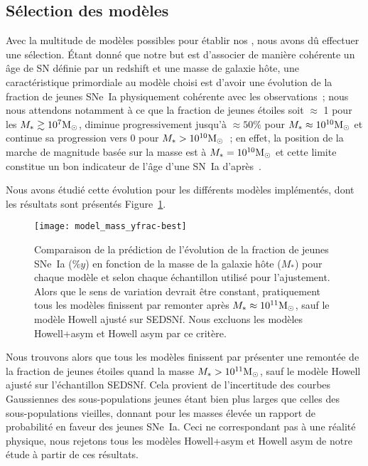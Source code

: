 \documentclass[../main/main.tex]{subfiles}
\begin{document}
\subsection{Sélection des modèles}\label{ssec:mmodsel}

Avec la multitude de modèles possibles pour établir nos \hostlib, nous avons dû
effectuer une sélection. Étant donné que notre but est d'associer de manière
cohérente un âge de SN définie par un redshift et une masse de galaxie hôte, une
caractéristique primordiale au modèle choisi est d'avoir une évolution de la
fraction de jeunes SNe~Ia physiquement cohérente avec les observations~; nous
nous attendons notamment à ce que la fraction de jeunes étoiles soit $\approx$ 1
pour les $M_* \gtrsim 10^7\si{\Msun}$, diminue progressivement jusqu'à $\approx
50\%$ pour $M_* \approx 10^{10}\si{\Msun}$ et continue sa progression vers 0
pour $M_* > 10^{10}\si{\Msun}$~; en effet, la position de la marche de magnitude
basée sur la masse est à $M_* = 10^{10}\si{\Msun}$ et cette limite constitue un
bon indicateur de l'âge d'une SN~Ia d'après~\cite{briday2022}.

Nous avons étudié cette évolution pour les différents modèles implémentés, dont
les résultats sont présentés Figure~\ref{fig:ypc}.

\begin{figure}[ht]
    \centerfloat
    \texttt{[image: model\_mass\_yfrac-best]}
    \caption[Comparaison de la prédiction de l'évolution de la fraction de
    jeunes SNe~Ia en fonction de la masse de la galaxie hôte]{Comparaison de la
        prédiction de l'évolution de la fraction de jeunes SNe~Ia ($\%y$) en
        fonction de la masse de la galaxie hôte ($M_*$) pour chaque modèle et
        selon chaque échantillon utilisé pour l'ajustement. Alors que le sens de
        variation devrait être constant, pratiquement tous les modèles finissent
        par remonter après $M_* \approx 10^{11}\si{\Msun}$, sauf le modèle
        Howell ajusté sur SEDSNf. Nous excluons les modèles Howell+asym et
    Howell asym par ce critère.}
    \label{fig:ypc}
\end{figure}

Nous trouvons alors que tous les modèles finissent par présenter une remontée de
la fraction de jeunes étoiles quand la masse $M_* > 10^{11}\si{\Msun}$, sauf le
modèle Howell ajusté sur l'échantillon SEDSNf. Cela provient de l'incertitude
des courbes Gaussiennes des sous-populations jeunes étant bien plus larges que
celles des sous-populations vieilles, donnant pour les masses élevée un rapport
de probabilité en faveur des jeunes SNe~Ia. Ceci ne correspondant pas à une
réalité physique, nous rejetons tous les modèles Howell+asym et Howell asym de
notre étude à partir de ces résultats.
\end{document}
